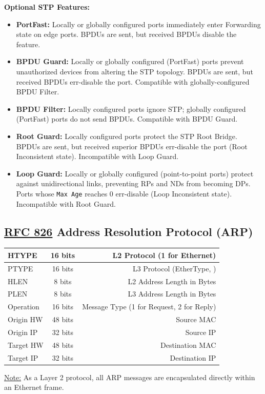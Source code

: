 \documentclass[12pt]{article}
\newif\ifcolor											%
\newcommand{\note}[1]{\ifcolor \colorbox{#1}{Note:}\else \underline{Note:}\fi}
\newcommand{\RFC}[1]{\href{https://datatracker.ietf.org/doc/html/rfc#1}{RFC #1}}
\begin{document}
	\textbf{Optional STP Features:}
	\begin{itemize}
		\label{itm:STP FEATURES}
		\item{\textbf{PortFast:} Locally or globally configured ports immediately enter Forwarding state on edge ports. BPDUs are sent, but received BPDUs disable the feature.}
		\item{\textbf{BPDU Guard:} Locally or globally configured (PortFast) ports prevent unauthorized devices from altering the STP topology. BPDUs are sent, but received BPDUs err-disable the port. Compatible with globally-configured BPDU Filter.}
		\item{\textbf{BPDU Filter:} Locally configured ports ignore STP; globally configured (PortFast) ports do not send BPDUs. Compatible with BPDU Guard.}
		\item{\textbf{Root Guard:} Locally configured ports protect the STP Root Bridge. BPDUs are sent, but received superior BPDUs err-disable the port (Root Inconsistent state). Incompatible with Loop Guard.}
		\item{\textbf{Loop Guard:} Locally or globally configured (point-to-point ports) protect against unidirectional links, preventing RPs and NDs from becoming DPs. Ports whose \texttt{Max Age} reaches 0 err-disable (Loop Inconsistent state). Incompatible with Root Guard.}
	\end{itemize}


	\subsection[RFC 826 ARP]{\RFC{826} Address Resolution Protocol (ARP) \label{subsec:ARP}}
	\begin{table}[H]
	\centering
	\begin{tabular}{| l | c | r |}\hline
	HTYPE	& 16 bits	& L2 Protocol (1 for Ethernet)\\\hline
	PTYPE	& 16 bits	& L3 Protocol (EtherType, \Cref{tab:ETHERTYPE})\\\hline
	HLEN		& 8 bits	& L2 Address Length in Bytes\\\hline
	PLEN		& 8 bits	& L3 Address Length in Bytes\\\hline
	Operation	& 16 bits	& Message Type (1 for Request, 2 for Reply)\\\hline
	Origin HW 	& 48 bits	& Source MAC\\\hline
	Origin IP	& 32 bits	& Source IP\\\hline
	Target HW 	& 48 bits	& Destination MAC\\\hline
	Target IP	& 32 bits	& Destination IP\\\hline
	\end{tabular}\end{table}
	\note{Goldenrod} As a Layer 2 protocol, all ARP messages are encapsulated directly within an Ethernet frame.
\end{document}
